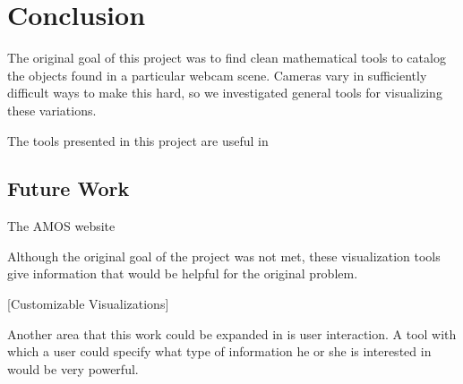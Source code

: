 \chapter{Conclusion}
\label{cpt:conclusion}

The original goal of this project was to find clean mathematical tools to catalog the objects found in a particular webcam scene.  Cameras vary in sufficiently difficult ways to make this hard, so we investigated general tools for visualizing these variations.

The tools presented in this project are useful in 

\section{Future Work}

The AMOS website


Although the original goal of the project was not met, these visualization tools give information that would be helpful for the original problem.  

[Customizable Visualizations]

Another area that this work could be expanded in is user interaction.  A tool with which a user could specify what type of information he or she is interested in would be very powerful.




